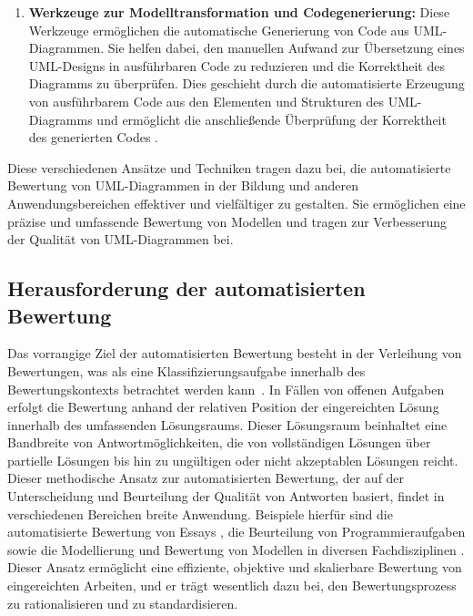\begin{enumerate}
    \begin{enumerate}
        \item \textbf{Werkzeuge zur Modelltransformation und Codegenerierung:}  Diese Werkzeuge ermöglichen die automatische Generierung von Code aus UML-Diagrammen. Sie helfen dabei, den manuellen Aufwand zur Übersetzung eines UML-Designs in ausführbaren Code zu reduzieren und die Korrektheit des Diagramms zu überprüfen. Dies geschieht durch die automatisierte Erzeugung von ausführbarem Code aus den Elementen und Strukturen des UML-Diagramms und ermöglicht die anschließende Überprüfung der Korrektheit des generierten Codes \cite{sturm2002generating}.
    \end{enumerate}
\end{enumerate}

Diese verschiedenen Ansätze und Techniken tragen dazu bei, die automatisierte Bewertung von UML-Diagrammen in der Bildung und anderen Anwendungsbereichen effektiver und vielfältiger zu gestalten. Sie ermöglichen eine präzise und umfassende Bewertung von Modellen und tragen zur Verbesserung der Qualität von UML-Diagrammen bei.

\subsection{Herausforderung der automatisierten Bewertung}

Das vorrangige Ziel der automatisierten Bewertung besteht in der Verleihung von Bewertungen, was als eine Klassifizierungsaufgabe innerhalb des Bewertungskontexts betrachtet werden kann~\cite{laumer2009assessment}. In Fällen von offenen Aufgaben erfolgt die Bewertung anhand der relativen Position der eingereichten Lösung innerhalb des umfassenden Lösungsraums. Dieser Lösungsraum beinhaltet eine Bandbreite von Antwortmöglichkeiten, die von vollständigen Lösungen über partielle Lösungen bis hin zu ungültigen oder nicht akzeptablen Lösungen reicht. Dieser methodische Ansatz zur automatisierten Bewertung, der auf der Unterscheidung und Beurteilung der Qualität von Antworten basiert, findet in verschiedenen Bereichen breite Anwendung. Beispiele hierfür sind die automatisierte Bewertung von Essays \cite{valenti2003overview}, die Beurteilung von Programmieraufgaben \cite{gross2012feedback} sowie die Modellierung und Bewertung von Modellen in diversen Fachdisziplinen \cite{sousa2015structural}. Dieser Ansatz ermöglicht eine effiziente, objektive und skalierbare Bewertung von eingereichten Arbeiten, und er trägt wesentlich dazu bei, den Bewertungsprozess zu rationalisieren und zu standardisieren.



